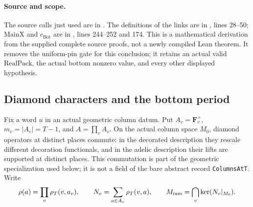 \documentclass[11pt,a4paper]{article}
\theoremstyle{definition}
\theoremstyle{remark}
\begin{document}
\paragraph{Source and scope.}
The source calls just used are in
.
The definitions of the links are in
,
lines 28--50; $\mathrm{MainX}$ and $c_{\mathrm{Bot}}$ are in
, lines 244--252
and 174.  This is a mathematical derivation from the supplied complete
source proofs, not a newly compiled Lean theorem.  It removes the
uniform-pin gate for this conclusion; it retains an actual valid
$\mathrm{RealPack}$, the actual bottom nonzero value, and every
other displayed hypothesis.


\subsection{Diamond characters and the bottom period}
\label{sec:diamond-fourier-anchor}

Fix a word $u$ in an actual geometric column datum.  Put
$A_v=\mathbf F_v^{\times}$, $m_v=|A_v|=T-1$, and
$A=\prod_v A_v$.  On the actual column space $M_0$, diamond operators
at distinct places commute: in the decorated description they rescale
different decoration functionals, and in the adelic description their
lifts are supported at distinct places.  This commutation is part of
the geometric specialization used below; it is not a field of the
bare abstract record \texttt{ColumnsAtT}.  Write
\[
 \rho(a)=\prod_v\rho_T(v,a_v),\qquad
 N_v=\sum_{a\in A_v}\rho_T(v,a),\qquad
 M_{\rm ram}=\bigcap_v\ker(N_v|_{M_0}).
\]
\end{document}
